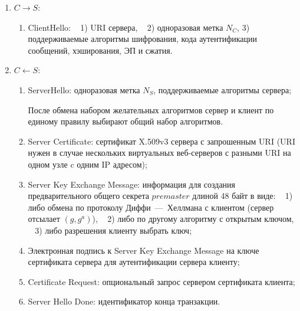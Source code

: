 \begin{enumerate}
    \item $C \rightarrow S$:
        \begin{enumerate}
            \item ClientHello: ~ 1) URI сервера, ~ 2) одноразовая метка $N_C$, 3) ~ поддерживаемые алгоритмы шифрования, кода аутентификации сообщений, хэширования, ЭП и сжатия.
        \end{enumerate}

    \item $C \leftarrow S$:
        \begin{enumerate}
            \item ServerHello: одноразовая метка $N_S$, поддерживаемые алгоритмы сервера;

            После обмена набором желательных алгоритмов сервер и клиент по единому правилу выбирают общий набор алгоритмов.
            \item Server Certificate: сертификат X.509v3 сервера с запрошенным URI (URI нужен в случае нескольких виртуальных веб-серверов с разными URI на одном узле c одним IP адресом);
            \item Server Key Exchange Message: информация для создания предварительного общего секрета $premaster$ длиной 48 байт в виде: ~ 1) либо обмена по протоколу Диффи~---~Хеллмана с клиентом (сервер отсылает $(g, g^a)$), ~ 2) либо по другому алгоритму с открытым ключом, ~ 3) либо разрешения клиенту выбрать ключ;
            \item Электронная подпись к Server Key Exchange Message на ключе сертификата сервера для аутентификации сервера клиенту;
            \item Certificate Request: опциональный запрос сервером сертификата клиента;
            \item Server Hello Done: идентификатор конца транзакции.
        \end{enumerate}


\end{enumerate}
